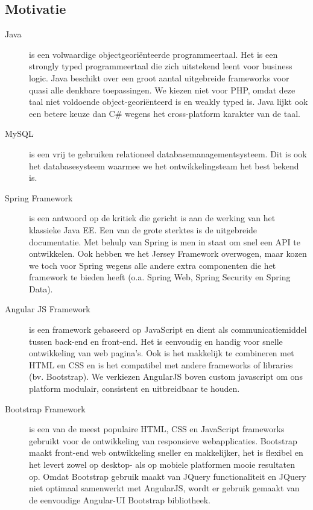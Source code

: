 \documentclass[a4paper]{article}
\begin{document}
\subsection{Motivatie}
\begin{description}
    \item[Java] is een volwaardige objectgeoriënteerde programmeertaal. Het is een strongly typed programmeertaal die zich uitstekend leent voor business logic. Java beschikt over een groot aantal uitgebreide frameworks voor quasi alle denkbare toepassingen. We kiezen niet voor PHP, omdat deze taal niet voldoende object-georiënteerd is en weakly typed is. Java lijkt ook een betere keuze dan C\# wegens het cross-platform karakter van de taal.
    \item[MySQL] is een vrij te gebruiken relationeel databasemanagementsysteem. Dit is ook het databasesysteem waarmee we het ontwikkelingsteam het best bekend is.
    \item[Spring Framework] is  een antwoord op de kritiek die gericht is aan de werking van het klassieke Java EE. Een van de grote sterktes is de uitgebreide documentatie. Met behulp van Spring is men in staat om snel een API te ontwikkelen. Ook hebben we het Jersey Framework overwogen, maar kozen we toch voor Spring wegens alle andere extra componenten die het framework te bieden heeft (o.a. Spring Web, Spring Security en Spring Data).
    \item[Angular JS Framework] is een framework gebaseerd op JavaScript en dient als communicatiemiddel tussen back-end en front-end. Het is eenvoudig en handig voor snelle ontwikkeling van web pagina's. Ook is het makkelijk te combineren met HTML en CSS en is het compatibel met andere frameworks of libraries (bv. Bootstrap). We verkiezen AngularJS boven custom javascript om ons platform modulair, consistent en uitbreidbaar te houden.
    \item[Bootstrap Framework] is een van de meest populaire HTML, CSS en JavaScript frameworks gebruikt voor de ontwikkeling van responsieve webapplicaties. Bootstrap maakt front-end web ontwikkeling sneller en makkelijker, het is flexibel en het levert zowel op desktop- als op mobiele platformen mooie resultaten op. Omdat Bootstrap gebruik maakt van JQuery functionaliteit en JQuery niet optimaal samenwerkt met AngularJS, wordt er gebruik gemaakt van de eenvoudige Angular-UI \cite{AngularUI} Bootstrap bibliotheek. 
\end{description}

\clearpage
\end{document}
